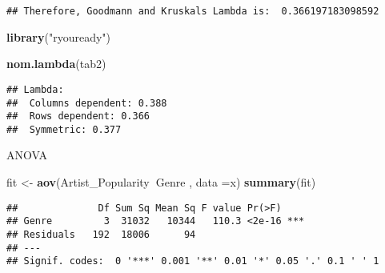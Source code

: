 \documentclass[
]{article}
\newenvironment{Shaded}{\begin{snugshade}}{\end{snugshade}}
\newcommand{\DataTypeTok}[1]{\textcolor[rgb]{0.13,0.29,0.53}{#1}}
\newcommand{\KeywordTok}[1]{\textcolor[rgb]{0.13,0.29,0.53}{\textbf{#1}}}
\newcommand{\NormalTok}[1]{#1}
\newcommand{\OperatorTok}[1]{\textcolor[rgb]{0.81,0.36,0.00}{\textbf{#1}}}
\newcommand{\StringTok}[1]{\textcolor[rgb]{0.31,0.60,0.02}{#1}}
\begin{document}
\begin{verbatim}
## Therefore, Goodmann and Kruskals Lambda is:  0.366197183098592
\end{verbatim}

\begin{Shaded}
\begin{Highlighting}[]
\KeywordTok{library}\NormalTok{(}\StringTok{"ryouready"}\NormalTok{)}

\KeywordTok{nom.lambda}\NormalTok{(tab2)}
\end{Highlighting}
\end{Shaded}

\begin{verbatim}
## Lambda:
##  Columns dependent: 0.388 
##  Rows dependent: 0.366 
##  Symmetric: 0.377
\end{verbatim}

ANOVA

\begin{Shaded}
\begin{Highlighting}[]
\NormalTok{fit <-}\StringTok{ }\KeywordTok{aov}\NormalTok{(Artist_Popularity}\OperatorTok{~}\NormalTok{Genre , }\DataTypeTok{data =}\NormalTok{x)}
\KeywordTok{summary}\NormalTok{(fit)}
\end{Highlighting}
\end{Shaded}

\begin{verbatim}
##              Df Sum Sq Mean Sq F value Pr(>F)    
## Genre         3  31032   10344   110.3 <2e-16 ***
## Residuals   192  18006      94                   
## ---
## Signif. codes:  0 '***' 0.001 '**' 0.01 '*' 0.05 '.' 0.1 ' ' 1
\end{verbatim}

\begin{Shaded}
\end{Shaded}
\end{document}
